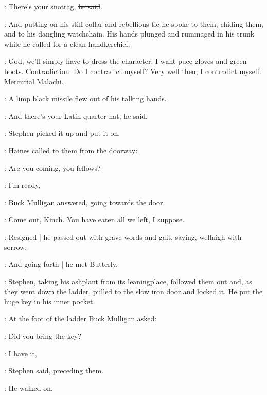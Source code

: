\Mulligan:
There's your snotrag,
\sout{he said}.

:
And putting on his stiff collar and rebellious tie
he spoke to them,
chiding them,
and to his dangling watchchain.
His hands plunged and rummaged in his trunk
while he called for a clean handkerchief.

\Mulligan:
God, we'll simply have to dress the character.
I want puce gloves and green boots.
Contradiction.
Do I contradict myself?
Very well then, I contradict myself.
Mercurial Malachi.

:
A limp black missile flew out of his talking hands.

\Mulligan:
And there's your Latin quarter hat,
\sout{he said}.

:
Stephen picked it up and put it on.

:
Haines called to them from the doorway:

\Haines:
Are you coming, you fellows?

\Mulligan:
I'm ready,

:
Buck Mulligan answered,
going towards the door.

\Mulligan:
Come out, Kinch.
You have eaten all we left, I suppose.

:
Resigned |
he passed out with grave words and gait,
saying,
wellnigh with sorrow:

\Mulligan:
And going forth |
he met Butterly.

:
Stephen,
taking his ashplant from its leaningplace,
followed them out
and, as they went down the ladder,
pulled to the slow iron door and locked it.
He put the huge key in his inner pocket.

:
At the foot of the ladder
Buck Mulligan asked:

\Mulligan:
Did you bring the key?

\Stephen:
I have it,

:
Stephen said,
preceding them.

:
He walked on.
